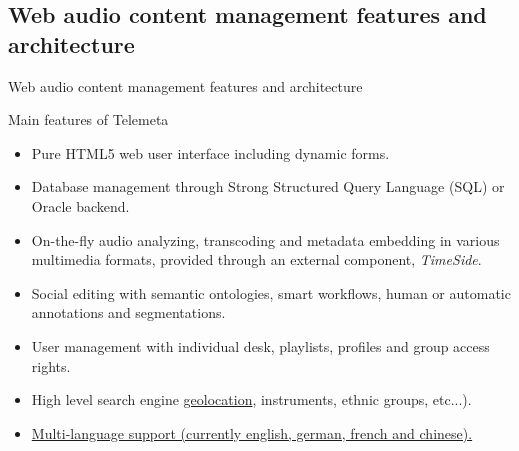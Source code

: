 \documentclass[final, hyperref, table]{beamer}
\begin{document}
\subsection{Web audio content management features and architecture}
\begin{frame}[label=telemeta_features]{Web audio content management features and architecture}
  \begin{block}{Main features of Telemeta}\footnotesize
    \begin{itemize}
      \item \alert{Pure HTML5} web user interface including dynamic forms.
      \item Database management through Strong Structured Query Language (\alert{SQL}) or Oracle backend.
      \item \alert{On-the-fly audio analyzing}, transcoding and metadata
        embedding in various multimedia formats, provided through an external component, \emph{TimeSide}.
      \item Social editing with semantic ontologies, smart workflows, human or automatic annotations and segmentations.
      \item \alert{User management} with individual desk, playlists, profiles
        and group access rights.
      \item High level \alert{search engine} \hyperlink{geonavigator}{geolocation}, instruments, ethnic groups, etc...).
      \item \hyperlink{telemeta_languages}{Multi-language support (currently english, german, french and chinese).}
      \end{itemize}
  \end{block}
\end{frame}
\end{document}
